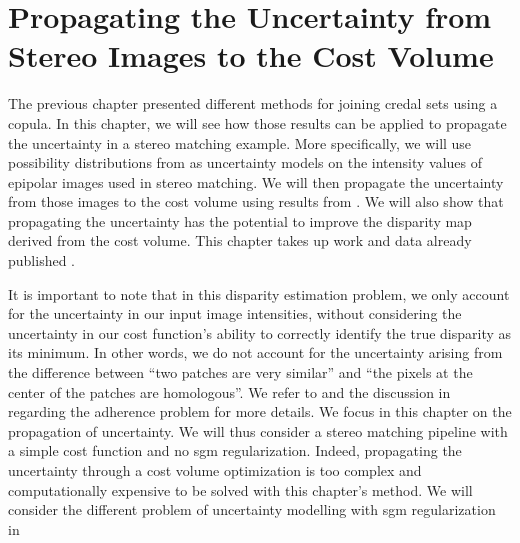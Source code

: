 \chapter{Propagating the Uncertainty from Stereo Images to the Cost Volume}\label{chap:propagating}
 The previous chapter presented different methods for joining credal sets using a copula. In this chapter, we will see how those results can be applied to propagate the uncertainty in a stereo matching example. More specifically, we will use possibility distributions from  as uncertainty models on the intensity values of epipolar images used in stereo matching. We will then propagate the uncertainty from those images to the cost volume using results from . We will also show that propagating the uncertainty has the potential to improve the disparity map derived from the cost volume. This chapter takes up work and data already published \cite{malinowski_copulas_2022, malinowski_uncertainty_2023}.

It is important to note that in this disparity estimation problem, we only account for the uncertainty in our input image intensities, without considering the uncertainty in our cost function's ability to correctly identify the true disparity as its minimum. In other words, we do not account for the uncertainty arising from the difference between ``two patches are very similar'' and ``the pixels at the center of the patches are homologous''. We refer to  and the discussion in  regarding the adherence problem for more details. We focus in this chapter on the propagation of uncertainty. We will thus consider a stereo matching pipeline with a simple cost function and no \acrshort{sgm} regularization. Indeed, propagating the uncertainty through a cost volume optimization is too complex and computationally expensive to be solved with this chapter's method. We will consider the different problem of uncertainty modelling with \acrshort{sgm} regularization in 

